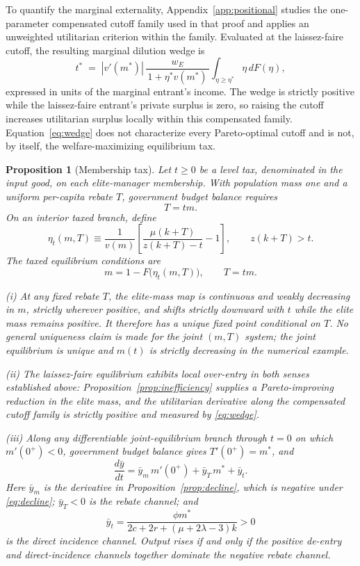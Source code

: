 \documentclass[12pt,letterpaper]{article}
\newtheorem{proposition}{Proposition}
\theoremstyle{definition}
\begin{document}
To quantify the marginal externality, Appendix~\ref{app:positional} studies the one-parameter compensated cutoff family used in that proof and applies an unweighted utilitarian criterion within the family.
Evaluated at the laissez-faire cutoff, the resulting marginal dilution wedge is
\begin{equation}\label{eq:wedge}
  t^\ast \;=\; \left|v'(m^\ast)\right|\, \frac{w_E}{\,1+\eta^\ast v(m^\ast)\,}
  \int_{\eta\geq\eta^\ast}\!\! \eta\, dF(\eta),
\end{equation}
expressed in units of the marginal entrant's income.
The wedge is strictly positive while the laissez-faire entrant's private surplus is zero, so raising the cutoff increases utilitarian surplus locally within this compensated family.
Equation~\eqref{eq:wedge} does not characterize every Pareto-optimal cutoff and is not, by itself, the welfare-maximizing equilibrium tax.

\begin{proposition}[Membership tax]\label{prop:tax}
Let $t\geq0$ be a level tax, denominated in the input good, on each elite-manager membership.
With population mass one and a uniform per-capita rebate $T$, government budget balance requires
\[
  T=tm.
\]
On an interior taxed branch, define
\[
  \eta_t(m,T)
  \equiv
  \frac{1}{v(m)}
  \left[
    \frac{\mu(k+T)}{z(k+T)-t}-1
  \right],
  \qquad z(k+T)>t.
\]
The taxed equilibrium conditions are
\[
  m=1-F\big(\eta_t(m,T)\big),
  \qquad
  T=tm.
\]

(i) At any fixed rebate $T$, the elite-mass map is continuous and weakly decreasing in $m$, strictly wherever positive, and shifts strictly downward with $t$ while the elite mass remains positive.
It therefore has a unique fixed point conditional on $T$.
No general uniqueness claim is made for the joint $(m,T)$ system; the joint equilibrium is unique and $m(t)$ is strictly decreasing in the numerical example.

(ii) The laissez-faire equilibrium exhibits local over-entry in both senses established above: Proposition~\ref{prop:inefficiency} supplies a Pareto-improving reduction in the elite mass, and the utilitarian derivative along the compensated cutoff family is strictly positive and measured by \eqref{eq:wedge}.

(iii) Along any differentiable joint-equilibrium branch through $t=0$ on which $m'(0^+)<0$, government budget balance gives $T'(0^+)=m^\ast$, and
\[
  \frac{d\bar y}{dt}
  =
  \bar y_m\,m'(0^+)
  +
  \bar y_T\,m^\ast
  +
  \bar y_t.
\]
Here $\bar y_m$ is the derivative in Proposition~\ref{prop:decline}, which is negative under \eqref{eq:decline}; $\bar y_T<0$ is the rebate channel; and
\[
  \bar y_t
  =
  \frac{\phi m^\ast}
  {2c+2r+(\mu+2\lambda-3)k}
  >0
\]
is the direct incidence channel.
Output rises if and only if the positive de-entry and direct-incidence channels together dominate the negative rebate channel.
\end{proposition}
\end{document}
